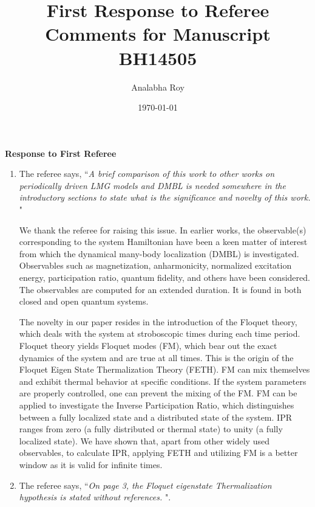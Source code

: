 \documentclass[aps,prb,reprint,showpacs,floatfix,superscriptaddress, onecolumn, nofootinbib, 9pt]{revtex4-2}
\newcommand{\ar}[1]{{\color{blue}#1}} %
\begin{document}

\title{First Response to Referee Comments for Manuscript BH14505}
\author{Analabha Roy}
\date{\today}

\maketitle

\vspace{1em}

\noindent \textbf{Response to First Referee}

\begin{enumerate}
\item The referee says, ``\textit{A brief comparison of this work to other works on periodically driven LMG models and DMBL is needed somewhere in the introductory sections to state what is the significance and novelty of this work. }"\\

\ar{
We thank the referee for raising this issue. In earlier works, the observable(s) corresponding to the system Hamiltonian have been a keen matter of interest from which the dynamical many-body localization (DMBL) is investigated. Observables such as magnetization, anharmonicity, normalized excitation energy, participation ratio, quantum fidelity, and others have been considered. The observables are computed for an extended duration. It is found in both closed and open quantum systems.

The novelty in our paper resides in the introduction of the Floquet theory, which deals with the system at stroboscopic times during each time period. Floquet theory yields Floquet modes (FM), which bear out the exact dynamics of the system and are true at all times. This is the origin of the Floquet Eigen State Thermalization Theory (FETH). FM can mix themselves and exhibit thermal behavior at specific conditions. If the system parameters are properly controlled, one can prevent the mixing of the FM. FM can be applied to investigate the Inverse Participation Ratio, which distinguishes between a fully localized state and a distributed state of the system. IPR ranges from zero (a fully distributed or thermal state) to unity (a fully localized state). We have shown that, apart from other widely used observables, to calculate IPR, applying FETH and utilizing FM is a better window as it is valid for infinite times.
}
\item The referee says, ``\textit{On page 3, the Floquet eigenstate Thermalization hypothesis is stated without references. }".\\


\end{enumerate}
\end{document}
